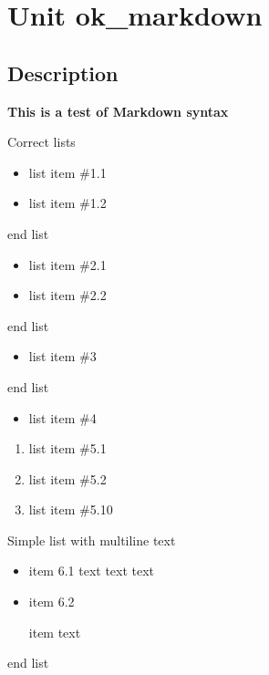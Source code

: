 \documentclass{report}
\begin{document}
\newlength{\tmplength}
\chapter{Unit ok{\_}markdown}
\section{Description}
\textbf{This is a test of Markdown syntax}\hfill\vspace*{1ex}

 Correct lists

\begin{itemize}
\item list item {\#}1.1
\item list item {\#}1.2
\end{itemize}end list

\begin{itemize}
\item list item {\#}2.1
\item list item {\#}2.2
\end{itemize}end list

\begin{itemize}
\item list item {\#}3
\end{itemize}end list

\begin{itemize}
\item list item {\#}4
\end{itemize}\begin{enumerate}
\setcounter{enumi}{0} \setcounter{enumii}{0} \setcounter{enumiii}{0} \setcounter{enumiv}{0} 
\item list item {\#}5.1
\setcounter{enumi}{1} \setcounter{enumii}{1} \setcounter{enumiii}{1} \setcounter{enumiv}{1} 
\item list item {\#}5.2
\setcounter{enumi}{2} \setcounter{enumii}{2} \setcounter{enumiii}{2} \setcounter{enumiv}{2} 
\item list item {\#}5.10
\end{enumerate}Simple list with multiline text

\begin{itemize}
\item item 6.1 text text text
\item item 6.2

item text
\end{itemize}end list
\end{document}
